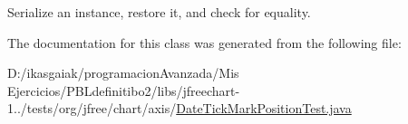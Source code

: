Serialize an instance, restore it, and check for equality. 

The documentation for this class was generated from the following file\+:\begin{DoxyCompactItemize}
\item 
D\+:/ikasgaiak/programacion\+Avanzada/\+Mis Ejercicios/\+P\+B\+Ldefinitibo2/libs/jfreechart-\/1../tests/org/jfree/chart/axis/\mbox{\hyperlink{_date_tick_mark_position_test_8java}{Date\+Tick\+Mark\+Position\+Test.\+java}}\end{DoxyCompactItemize}
